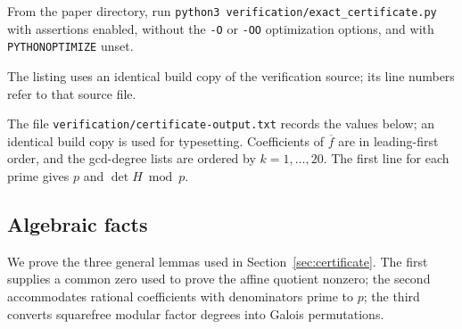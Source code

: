 From the paper directory, run
\texttt{python3 verification/exact\_certificate.py} with assertions enabled,
without the \texttt{-O} or \texttt{-OO} optimization options, and with
\texttt{PYTHONOPTIMIZE} unset.

The listing uses an identical build copy of the verification source; its line numbers refer to that source file.



The file \texttt{verification/certificate-output.txt} records the values below; an identical build copy is used for typesetting.
Coefficients of
$\overline f$ are in leading-first order, and the gcd-degree lists are
ordered by $k=1,\ldots,20$.  The first line for each prime gives $p$ and
$\det H\bmod p$.



\subsection{Algebraic facts}
\label{app:certificate-algebra}

We prove the three general lemmas used in Section~\ref{sec:certificate}.
The first supplies a common zero used to prove the affine quotient nonzero;
the second accommodates rational coefficients with denominators prime to $p$;
the third converts squarefree modular factor degrees into Galois permutations.

